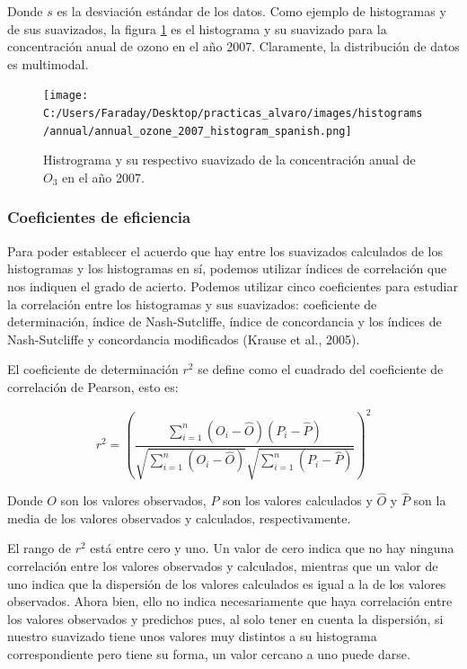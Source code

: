 \documentclass[12pt]{article}
\begin{document}
Donde $s$ es la desviación estándar de los datos. Como ejemplo de histogramas y de sus suavizados, la figura \ref{fig:hist-ejem-1} es el histograma y su suavizado para la concentración anual de ozono en el año 2007. Claramente, la distribución de datos es multimodal.

\begin{figure}[H]
\centering
\texttt{[image: C:/Users/Faraday/Desktop/practicas\_alvaro/images/histograms/annual/annual\_ozone\_2007\_histogram\_spanish.png]}
\caption{Histrograma y su respectivo suavizado de la concentración anual de $O_{3}$ en el año 2007.}
\label{fig:hist-ejem-1}
\end{figure}

\subsubsection{Coeficientes de eficiencia}

Para poder establecer el acuerdo que hay entre los suavizados calculados de los histogramas y los histogramas en sí, podemos utilizar índices de correlación que nos indiquen el grado de acierto. Podemos utilizar cinco coeficientes para estudiar la correlación entre los histogramas y sus suavizados: coeficiente de determinación, índice de Nash-Sutcliffe, índice de concordancia y los índices de Nash-Sutcliffe y concordancia modificados (Krause et al., 2005).

El coeficiente de determinación $r^{2}$ se define como el cuadrado del coeficiente de correlación de Pearson, esto es:

\begin{equation}
r^{2} = \left(\frac{\sum^{n}_{i=1}(O_{i} - \hat{O})(P_{i} - \hat{P})}{\sqrt{\sum^{n}_{i=1}(O_{i} - \hat{O})} \sqrt{\sum^{n}_{i=1}(P_{i} - \hat{P})}} \right)^{2}
\label{eq:coeficiente_determinacion}
\end{equation}

Donde $O$ son los valores observados, $P$ son los valores calculados y $\hat{O}$ y $\hat{P}$ son la media de los valores observados y calculados, respectivamente.

El rango de $r^{2}$ está entre cero y uno. Un valor de cero indica que no hay ninguna correlación entre los valores observados y calculados, mientras que un valor de uno indica que la dispersión de los valores calculados es igual a la de los valores observados. Ahora bien, ello no indica necesariamente que haya correlación entre los valores observados y predichos pues, al solo tener en cuenta la dispersión, si nuestro suavizado tiene unos valores muy distintos a su histograma correspondiente pero tiene su forma, un valor cercano a uno puede darse.
\end{document}
